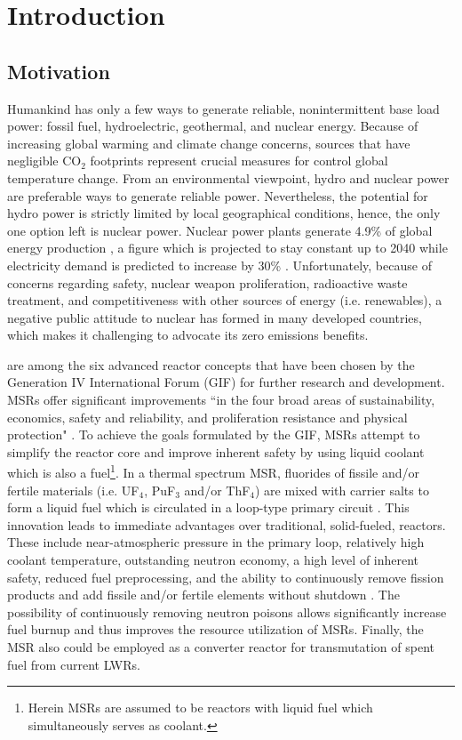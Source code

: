 \chapter[Introduction]{Introduction}

\section{Motivation}

Humankind has only a few ways to generate reliable, nonintermittent 
base load power: fossil fuel, hydroelectric, geothermal, and 
nuclear energy. Because of increasing global warming and climate 
change concerns, sources that have negligible CO$_2$ footprints 
represent crucial measures for control global temperature change. 
From an environmental viewpoint, hydro and nuclear power are 
preferable ways to generate reliable power. Nevertheless, the 
potential for hydro power is strictly limited by local geographical 
conditions, hence, the only one option left is nuclear power. Nuclear 
power plants generate 4.9\% of global energy production \cite{noauthor_key_2017}, a figure which is projected to stay constant up to 2040 while 
electricity demand is predicted to increase by 30\% \cite{noauthor_world_2017}.  Unfortunately, because of concerns regarding safety, nuclear weapon 
proliferation, radioactive waste treatment, and competitiveness with 
other sources of energy (i.e. renewables), a negative public attitude 
to nuclear has formed in many developed countries, which makes it 
challenging to advocate its zero emissions benefits.

 are among the six advanced reactor 
concepts that have been chosen by the Generation IV International 
Forum (GIF) for further research and development. \glspl{MSR} 
offer significant improvements ``in the four broad areas of 
sustainability, economics, safety and reliability, and proliferation 
resistance and physical protection" \cite{doe_technology_2002}. To 
achieve the goals formulated by the GIF, \glspl{MSR} attempt to 
simplify the reactor core and improve inherent safety by using 
liquid coolant which is also a fuel\footnote{Herein \glspl{MSR} are 
assumed to be reactors with liquid fuel which simultaneously serves 
as coolant.}. In a thermal spectrum \gls{MSR}, fluorides of fissile 
and/or fertile materials (i.e. UF$_4$, PuF$_3$ and/or ThF$_4$) are 
mixed with carrier salts to form a liquid fuel which is circulated 
in a loop-type primary circuit \cite{haubenreich_experience_1970}. 
This innovation leads to immediate advantages over traditional, 
solid-fueled, reactors. These include near-atmospheric pressure 
in the primary loop, relatively high coolant temperature, outstanding 
neutron economy, a high level of inherent safety, reduced fuel 
preprocessing, and the ability to continuously remove fission products 
and add fissile and/or fertile elements without shutdown  \cite{leblanc_molten_2010}. The possibility of continuously removing 
neutron poisons allows significantly increase fuel burnup and thus 
improves the resource utilization of \glspl{MSR}. Finally, the \gls{MSR} 
also could be employed as a converter reactor for transmutation of 
spent fuel from current \glspl{LWR}.

